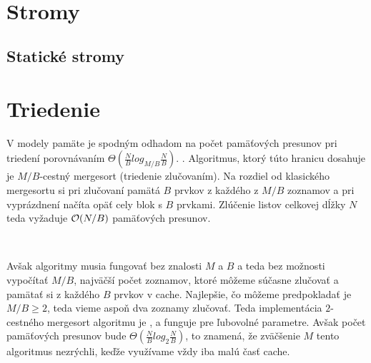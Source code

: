 \



\section{Stromy}
\subsection{Statické stromy}




\section{Triedenie}

V \aware modely pamäte je spodným odhadom na počet pamäťových presunov pri triedení porovnávaním $\Theta(\frac{N}{B}log_{M/B}\frac{N}{B})$. \citep{AggVitt88, Demaine02}. Algoritmus, ktorý túto hranicu dosahuje je $M/B$-cestný mergesort (triedenie zlučovaním). Na rozdiel od klasického mergesortu si pri zlučovaní pamätá $B$ prvkov z každého z $M/B$ zoznamov a pri vyprázdnení načíta opäť cely blok s $B$ prvkami. Zlúčenie listov celkovej dĺžky $N$ teda vyžaduje $\mathcal{O}(N/B)$ pamäťových presunov.

\

Avšak \obliv algoritmy musia fungovať bez znalosti $M$ a $B$ a teda bez možnosti vypočítať $M/B$, najväčší počet zoznamov, ktoré môžeme súčasne zlučovať a pamätať si z každého $B$ prvkov v cache. Najlepšie, čo môžeme predpokladať je $M/B \ge 2$, teda vieme aspoň dva zoznamy zlučovať. Teda implementácia $2$-cestného mergesort algoritmu je \obliv, a funguje pre ľubovolné parametre. Avšak počet pamäťových presunov bude $\Theta(\frac{N}{B}log_{2}\frac{N}{B})$, to znamená, že zväčšenie $M$ tento algoritmus nezrýchli, keďže využívame vždy iba malú časť cache. 

